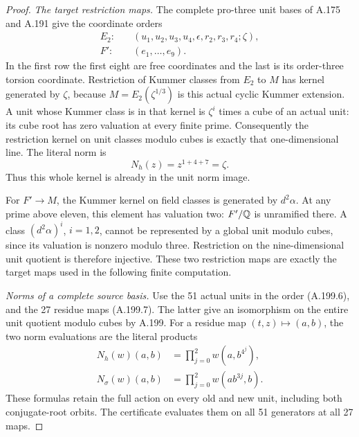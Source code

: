 \begin{proof}
\emph{The target restriction maps.}
The complete pro-three unit bases of A.175 and A.191 give
the coordinate orders
\[
\begin{aligned}
 E_2:&\quad (u_1,u_2,u_3,u_4,\epsilon,r_2,r_3,r_4;
                  \zeta),\\
 F':&\quad (e_1,\ldots,e_9).
\end{aligned}
\tag{A.203.5}
\]
In the first row the first eight are free coordinates and
the last is its order-three torsion coordinate.
Restriction of Kummer classes from \(E_2\) to \(M\)
has kernel generated by \(\zeta\), because
\(M=E_2(\zeta^{1/3})\) is this actual cyclic Kummer
extension.  A unit whose Kummer class is in that kernel
is \(\zeta^i\) times a cube of an actual unit: its
cube root has zero valuation at every finite prime.
Consequently the restriction kernel on unit classes
modulo cubes is exactly that one-dimensional line.
The literal norm is
\[
                  N_h(z)=z^{1+4+7}=\zeta.
\tag{A.203.6}
\]
Thus this whole kernel is already in the unit norm image.

For \(F'\to M\), the Kummer kernel on field classes is
generated by \(d^2\alpha\).  At any prime above eleven,
this element has valuation two: \(F'/\mathbb Q\) is unramified
there.  A class \((d^2\alpha)^i\), \(i=1,2\), cannot
be represented by a global unit modulo cubes, since its
valuation is nonzero modulo three.  Restriction on the
nine-dimensional unit quotient is therefore injective.
These two restriction maps are exactly the target maps
used in the following finite computation.

\emph{Norms of a complete source basis.}
Use the 51 actual units in the order (A.199.6), and the
27 residue maps (A.199.7).  The latter give an isomorphism
on the entire unit quotient modulo cubes by A.199.
For a residue map \((t,z)\mapsto(a,b)\), the two norm
evaluations are the literal products
\[
\begin{aligned}
 N_h(w)(a,b)&=\prod_{j=0}^2w(a,b^{4^j}),\\
 N_\sigma(w)(a,b)&=\prod_{j=0}^2w(ab^{3j},b).
\end{aligned}
\tag{A.203.7}
\]
These formulas retain the full action on every old and
new unit, including both conjugate-root orbits.  The
certificate evaluates them on all 51 generators at all
27 maps.


\end{proof}
